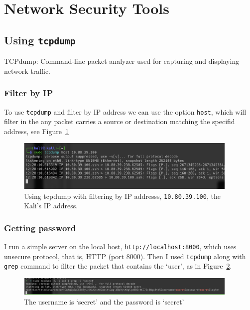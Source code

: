 \documentclass{article}
\def\c#1{\texttt{#1}}
\begin{document}


\section{Network Security Tools} %
\label{sec:Network Security Tools}

\subsection{Using \c{tcpdump}}
TCPdump: Command-line packet analyzer used for capturing and displaying network traffic.

\subsubsection{Filter by IP}
To use \c{tcpdump} and filter by IP address we can use the option \c{host}, which will filter in the any packet carries a source
or destination matching the specifid address, see Figure~\ref{fig:tcpdump-by-ip}

\begin{figure}[ht]
	\begin{center}
		\includegraphics[width=0.95\textwidth]{figures/tcpdump-by-ip.png}
	\end{center}
	\caption{Using tcpdump with filtering by IP addresss, \c{10.80.39.100}, the Kali's IP address.}
	\label{fig:tcpdump-by-ip}
\end{figure}


\subsubsection{Getting password}
I run a simple server on the local host, \c{http://localhost:8000}, which uses unsecure protocol, that is, HTTP (port 8000).
Then I used \c{tcpdump} along with \c{grep} command to filter the packet that contains the `user', as in Figure~\ref{fig:tcpdump-pass}.

\begin{figure}[ht]
	\begin{center}
		\includegraphics[width=0.95\textwidth]{figures/tcpdump-pass.png}
	\end{center}
	\caption{The username is `secret' and the password is `secret'}
	\label{fig:tcpdump-pass}
\end{figure}
\end{document}
